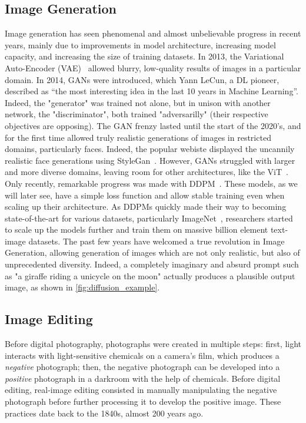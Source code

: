 \subsection{Image Generation}
Image generation has seen phenomenal and almost unbelievable progress in recent years, mainly due to improvements in model architecture, 
increasing model capacity, and increasing the size of training datasets.
In 2013, the Variational Auto-Encoder (\ac{VAE})~\citep{Kingma2014} allowed blurry, low-quality results of images in a particular domain. In 2014,
\ac{GAN}s were introduced, which Yann LeCun, a \ac{DL} pioneer, described as “the most interesting idea 
 in the last 10 years in Machine Learning”. Indeed, the "generator" was trained not alone, but in unison with another network, the "discriminator",
 both trained "adversarilly" (their respective objectives are opposing). The \ac{GAN} frenzy lasted until the start of the 2020's, and for the
  first time  allowed truly realistic generations of images in restricted domains, particularly faces. Indeed, the popular webiste
    displayed the uncannily realistic face generations using StyleGan~\citep{karra2019stylegan, karra2020stylegan2}.
    However, \ac{GAN}s struggled with 
   larger and more diverse domains, leaving room for other architectures, like the \ac{ViT}~\citep{esser2021taming, ramesh2021zero, ding2021cogview}.
    Only recently,
   remarkable progress was made with \ac{DDPM}~\citep{ho2020denoising,nichol2021glide, rombach2022high, ramesh2022hierarchical, saharia2022photorealistic}. 
   These models, as we will later see, have a simple loss function and allow stable training even when scaling up their architecture.
   As \ac{DDPM}s quickly made their way to becoming state-of-the-art for various datasets, particularly ImageNet~\citep{deng2009imagenet}, researchers
   started to scale up the models further and train them on massive billion element text-image datasets. The past few years have welcomed
   a true revolution in Image Generation, allowing generation of images which are not only realistic, but also of unprecedented diversity.
   Indeed, a completely imaginary and absurd prompt such as "a giraffe riding a unicycle on the moon" actually produces a  plausible 
   output image, as shown in \ref{fig:diffusion_example}.



   

\subsection{Image Editing}
Before digital photography, photographs were created in multiple steps: first, light interacts with light-sensitive chemicals on 
a camera's film, which produces a \emph{negative} photograph; then, the negative photograph can be developed into a \emph{positive} 
photograph in a darkroom with the help of chemicals. Before digital editing, real-image editing 
consisted in manually manipulating the negative 
photograph before further processing it to develop the positive image. These practices date back to the 1840s, almost 200 years ago.

